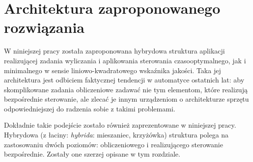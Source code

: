 \chapter{Architektura zaproponowanego rozwiązania}
\label{cha:arch}

W niniejszej pracy została zaproponowana hybrydowa struktura aplikacji realizującej zadania wyliczania i aplikowania sterowania czasooptymalnego, jak i minimalnego w sensie liniowo-kwadratowego wskaźnika jakości.
Taka jej architektura jest odbiciem faktycznej tendencji w automatyce ostatnich lat: aby skomplikowane zadania obliczeniowe zadawać nie tym elementom, które realizują bezpośrednie sterowanie, ale zlecać je innym urządzeniom o architekturze sprzętu odpowiedniejszej do radzenia sobie z takimi problemami.

Dokładnie takie podejście zostało również zaprezentowane w niniejszej pracy. Hybrydowa (z łaciny: \emph{hybrida}: mieszaniec, krzyżówka) struktura polega na zastosowaniu dwóch poziomów: obliczeniowego i realizującego sterowanie bezpośrednie. Zostały one szerzej opisane w tym rozdziale.








